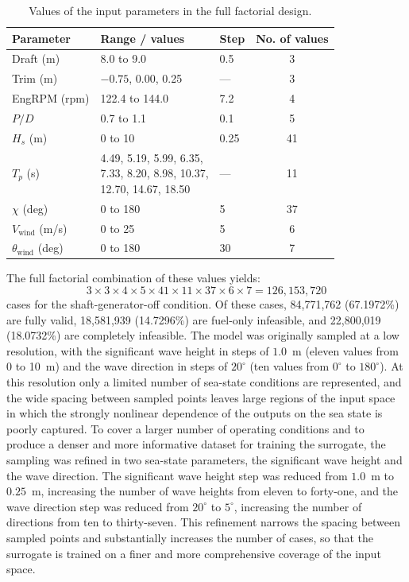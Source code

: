 \documentclass[final,5p,times,twocolumn,numbers]{elsarticle}
\begin{document}
\begin{table}[ht] \footnotesize
\centering
\caption{Values of the input parameters in the full factorial design.}
\label{tab:ranges}
\begin{tabular}{lllc}
\hline
Parameter & Range / values & Step & No. of values \\
\hline
Draft (m) & 8.0 to 9.0 & 0.5 & 3 \\
Trim (m) & $-0.75$, 0.00, 0.25 & --- & 3 \\
EngRPM (rpm) & 122.4 to 144.0 & 7.2 & 4 \\
$P/D$ & 0.7 to 1.1 & 0.1 & 5 \\
$H_s$ (m) & 0 to 10 & 0.25 & 41 \\
$T_p$ (s) & \makecell[l]{4.49, 5.19, 5.99, 6.35,\\ 7.33, 8.20, 8.98, 10.37,\\ 12.70, 14.67, 18.50} & --- & 11 \\
$\chi$ (deg) & 0 to 180 & 5 & 37 \\
$V_\mathrm{wind}$ (m/s) & 0 to 25 & 5 & 6 \\
$\theta_\mathrm{wind}$ (deg) & 0 to 180 & 30 & 7 \\
\hline
\end{tabular}
\end{table}

The full factorial combination of these values yields:
\begin{equation}
3 \times 3 \times 4 \times 5 \times 41 \times 11 \times 37 \times 6 \times 7 = 126{,}153{,}720
\label{eq:total}
\end{equation}
cases for the shaft-generator-off condition. Of these cases, 84{,}771{,}762 (67.1972\%) are fully valid, 18{,}581{,}939 (14.7296\%) are fuel-only infeasible, and 22{,}800{,}019 (18.0732\%) are completely infeasible. The model was originally sampled at a low resolution, with the significant wave height in steps of $1.0$~m (eleven values from 0 to 10~m) and the wave direction in steps of $20^\circ$ (ten values from $0^\circ$ to $180^\circ$). At this resolution only a limited number of sea-state conditions are represented, and the wide spacing between sampled points leaves large regions of the input space in which the strongly nonlinear dependence of the outputs on the sea state is poorly captured. To cover a larger number of operating conditions and to produce a denser and more informative dataset for training the surrogate, the sampling was refined in two sea-state parameters, the significant wave height and the wave direction. The significant wave height step was reduced from $1.0$~m to $0.25$~m, increasing the number of wave heights from eleven to forty-one, and the wave direction step was reduced from $20^\circ$ to $5^\circ$, increasing the number of directions from ten to thirty-seven. This refinement narrows the spacing between sampled points and substantially increases the number of cases, so that the surrogate is trained on a finer and more comprehensive coverage of the input space. 
\end{document}
